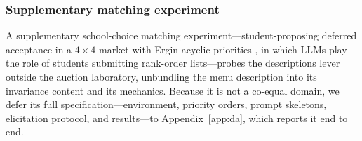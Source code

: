 \subsubsection{Supplementary matching experiment}\label{sec:design-da}

A supplementary school-choice matching experiment---student-proposing deferred
acceptance in a $4\times4$ market with Ergin-acyclic priorities
\citep{ergin2002efficient,ashlagi2018stable}, in which LLMs play the role of
students submitting rank-order lists---probes the descriptions lever outside the
auction laboratory, unbundling the menu description into its invariance content
and its mechanics. Because it is not a co-equal domain, we defer its full
specification---environment, priority orders, prompt skeletons, elicitation
protocol, and results---to Appendix~\ref{app:da}, which reports it end to end.

